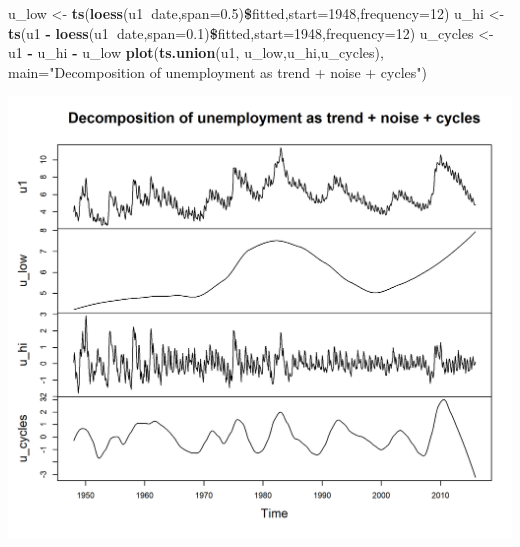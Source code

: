 \documentclass[]{article}
\newenvironment{Shaded}{\begin{snugshade}}{\end{snugshade}}
\newcommand{\KeywordTok}[1]{\textcolor[rgb]{0.13,0.29,0.53}{\textbf{#1}}}
\newcommand{\DataTypeTok}[1]{\textcolor[rgb]{0.13,0.29,0.53}{#1}}
\newcommand{\DecValTok}[1]{\textcolor[rgb]{0.00,0.00,0.81}{#1}}
\newcommand{\FloatTok}[1]{\textcolor[rgb]{0.00,0.00,0.81}{#1}}
\newcommand{\StringTok}[1]{\textcolor[rgb]{0.31,0.60,0.02}{#1}}
\newcommand{\OperatorTok}[1]{\textcolor[rgb]{0.81,0.36,0.00}{\textbf{#1}}}
\newcommand{\NormalTok}[1]{#1}
\begin{document}
\begin{Shaded}
\begin{Highlighting}[]
\NormalTok{u_low <-}\StringTok{ }\KeywordTok{ts}\NormalTok{(}\KeywordTok{loess}\NormalTok{(u1}\OperatorTok{~}\NormalTok{date,}\DataTypeTok{span=}\FloatTok{0.5}\NormalTok{)}\OperatorTok{\$}\NormalTok{fitted,}\DataTypeTok{start=}\DecValTok{1948}\NormalTok{,}\DataTypeTok{frequency=}\DecValTok{12}\NormalTok{)}
\NormalTok{u_hi <-}\StringTok{ }\KeywordTok{ts}\NormalTok{(u1 }\OperatorTok{-}\StringTok{ }\KeywordTok{loess}\NormalTok{(u1}\OperatorTok{~}\NormalTok{date,}\DataTypeTok{span=}\FloatTok{0.1}\NormalTok{)}\OperatorTok{\$}\NormalTok{fitted,}\DataTypeTok{start=}\DecValTok{1948}\NormalTok{,}\DataTypeTok{frequency=}\DecValTok{12}\NormalTok{)}
\NormalTok{u_cycles <-}\StringTok{ }\NormalTok{u1 }\OperatorTok{-}\StringTok{ }\NormalTok{u_hi }\OperatorTok{-}\StringTok{ }\NormalTok{u_low}
\KeywordTok{plot}\NormalTok{(}\KeywordTok{ts.union}\NormalTok{(u1, u_low,u_hi,u_cycles),}
  \DataTypeTok{main=}\StringTok{"Decomposition of unemployment as trend + noise + cycles"}\NormalTok{)}
\end{Highlighting}
\end{Shaded}

\begin{center}\includegraphics{figure/intro-cycles-1} \end{center}
\end{document}
